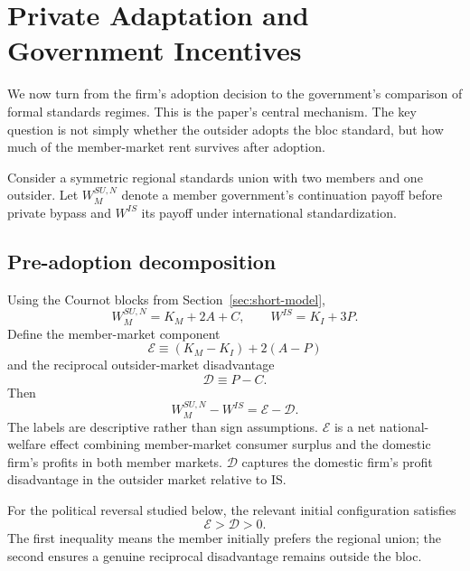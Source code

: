 \section{Private Adaptation and Government Incentives}
\label{sec:short-incentives}

We now turn from the firm's adoption decision to the government's comparison of formal standards regimes. This is the paper's central mechanism. The key question is not simply whether the outsider adopts the bloc standard, but how much of the member-market rent survives after adoption.

Consider a symmetric regional standards union with two members and one outsider. Let $W_M^{SU,N}$ denote a member government's continuation payoff before private bypass and $W^{IS}$ its payoff under international standardization.

\subsection{Pre-adoption decomposition}
\label{subsec:selective-decomposition}

Using the Cournot blocks from Section~\ref{sec:short-model},
\begin{equation}
    W_M^{SU,N}=K_M+2A+C,
    \qquad
    W^{IS}=K_I+3P.
    \label{eq:canonical-welfare-pairs}
\end{equation}
Define the member-market component
\begin{equation}
    \mathscr E
    \equiv
    (K_M-K_I)+2(A-P)
    \label{eq:exclusion-surplus}
\end{equation}
and the reciprocal outsider-market disadvantage
\begin{equation}
    \mathscr D
    \equiv
    P-C.
    \label{eq:reciprocal-disadvantage}
\end{equation}
Then
\begin{equation}
    \boxed{
    W_M^{SU,N}-W^{IS}
    =\mathscr E-\mathscr D.
    }
    \label{eq:selective-before}
\end{equation}
The labels are descriptive rather than sign assumptions. $\mathscr E$ is a net national-welfare effect combining member-market consumer surplus and the domestic firm's profits in both member markets. $\mathscr D$ captures the domestic firm's profit disadvantage in the outsider market relative to IS.

For the political reversal studied below, the relevant initial configuration satisfies
\begin{equation}
    \mathscr E>\mathscr D>0.
    \label{eq:initial-preference-condition}
\end{equation}
The first inequality means the member initially prefers the regional union; the second ensures a genuine reciprocal disadvantage remains outside the bloc.


